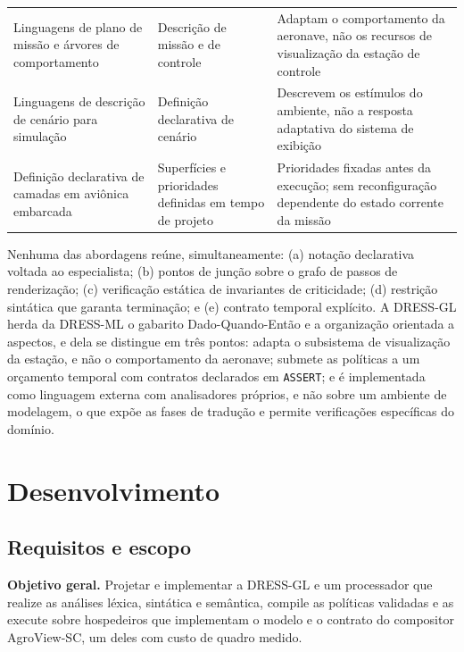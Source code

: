 \documentclass[conference]{IEEEtran}
\begin{document}
\begin{table}[t]
\begin{tabularx}{\textwidth}{@{}>{\raggedright\arraybackslash}p{}
                               >{\raggedright\arraybackslash}p{}L@{}}
\addlinespace
Linguagens de plano de missão e árvores de comportamento &
Descrição de missão e de controle &
Adaptam o comportamento da aeronave, não os recursos de visualização da
estação de controle \\
\addlinespace
Linguagens de descrição de cenário para simulação &
Definição declarativa de cenário &
Descrevem os estímulos do ambiente, não a resposta adaptativa do sistema de
exibição \\
\addlinespace
Definição declarativa de camadas em aviônica embarcada &
Superfícies e prioridades definidas em tempo de projeto &
Prioridades fixadas antes da execução; sem reconfiguração dependente do estado
corrente da missão \\
\bottomrule
\end{tabularx}
\end{table}

Nenhuma das abordagens reúne, simultaneamente: (a) notação declarativa voltada
ao especialista; (b) pontos de junção sobre o grafo de passos de renderização;
(c) verificação estática de invariantes de criticidade; (d) restrição sintática
que garanta terminação; e (e) contrato temporal explícito. A DRESS-GL herda da
DRESS-ML o gabarito Dado-Quando-Então e a organização orientada a aspectos, e
dela se distingue em três pontos: adapta o subsistema de visualização da
estação, e não o comportamento da aeronave; submete as políticas a um
orçamento temporal com contratos declarados em \texttt{ASSERT}; e é
implementada como linguagem externa com analisadores próprios, e não sobre um
ambiente de modelagem, o que expõe as fases de tradução e permite verificações
específicas do domínio.

\section{Desenvolvimento}
\label{sec:desenvolvimento}

\subsection{Requisitos e escopo}
\label{sec:requisitos}

\textbf{Objetivo geral.} Projetar e implementar a DRESS-GL e um processador que
realize as análises léxica, sintática e semântica, compile as políticas
validadas e as execute sobre hospedeiros que implementam o modelo e o contrato
do compositor AgroView-SC, um deles com custo de quadro medido.
\end{document}
